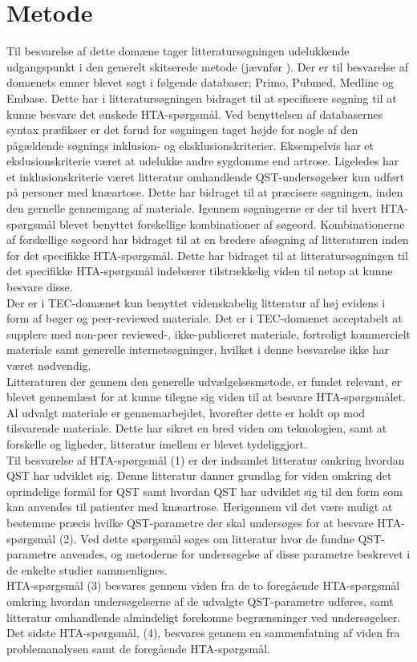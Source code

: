 \section{Metode}
Til besvarelse af dette domæne tager litteratursøgningen udelukkende udgangspunkt i den generelt skitserede metode (jævnfør ). Der er til besvarelse af domænets emner blevet søgt i følgende databaser; Primo, Pubmed, Medline og Embase. Dette har i litteratursøgningen bidraget til at specificere søgning til at kunne besvare det ønskede HTA-spørgsmål. Ved benyttelsen af databasernes syntax præfikser er det forud for søgningen taget højde for nogle af den pågældende søgnings inklusion- og eksklusionskriterier. Eksempelvis har et ekslusionskriterie været at udelukke andre sygdomme end artrose. Ligeledes har et inklusionskriterie været litteratur omhandlende QST-undersøgelser kun udført på personer med knæartose.  Dette har bidraget til at præcisere søgningen, inden den gernelle gennemgang af materiale. Igennem søgningerne er der til hvert HTA-spørgsmål blevet benyttet forskellige kombinationer af søgeord. Kombinationerne af forskellige søgeord har bidraget til at en bredere afsøgning af litteraturen inden for det specifikke HTA-spørgsmål. Dette har bidraget til at litteratursøgningen til det specifikke HTA-spørgsmål indebærer tilstrækkelig viden til netop at kunne besvare disse. \\
Der er i TEC-domænet kun benyttet videnskabelig litteratur af høj evidens i form af bøger og peer-reviewed materiale. Det er i TEC-domænet acceptabelt at supplere med non-peer reviewed-, ikke-publiceret materiale, fortroligt kommercielt materiale samt generelle internetsøgninger, hvilket i denne besvarelse ikke har været nødvendig. \citep{HTAcore} \\
Litteraturen der gennem den generelle udvælgelsesmetode, er fundet relevant, er blevet gennemlæst for at kunne tilegne sig viden til at besvare HTA-spørgsmålet. Al udvalgt materiale er gennemarbejdet, hvorefter dette er holdt op mod tilsvarende materiale. Dette har sikret en bred viden om teknologien, samt at forskelle og ligheder, litteratur imellem er blevet tydeliggjort. \\
Til besvarelse af HTA-spørgsmål (1) er der indsamlet litteratur omkring hvordan QST har udviklet sig. Denne litteratur danner grundlag for viden omkring det oprindelige formål for QST samt hvordan QST har udviklet sig til den form som kan anvendes til patienter med knæartrose. Herigennem vil det være muligt at bestemme præcis hvilke QST-parametre der skal undersøges for at besvare HTA-spørgsmål (2). Ved dette spørgsmål søges om litteratur hvor de fundne QST-parametre anvendes, og metoderne for undersøgelse af disse parametre beskrevet i de enkelte studier sammenlignes. \\
HTA-spørgsmål (3) besvares gennem viden fra de to foregående HTA-spørgsmål omkring hvordan undersøgelserne af de udvalgte QST-parametre udføres, samt litteratur omhandlende almindeligt forekomne begrænsninger ved undersøgelser. Det sidste HTA-spørgsmål, (4), besvares gennem en sammenfatning af viden fra problemanalysen samt de foregående HTA-spørgsmål.    
 
